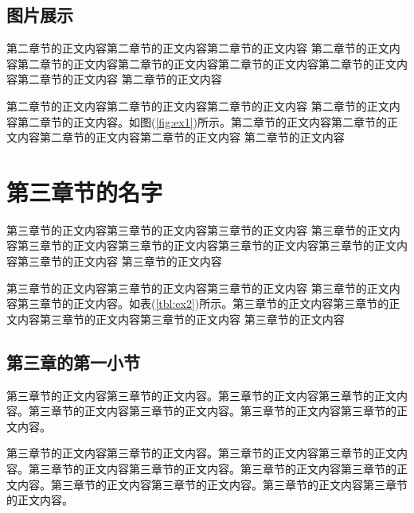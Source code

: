 \documentclass{yacaugrad}
\begin{document}
\subsection{图片展示}

第二章节的正文内容第二章节的正文内容\cite{王夫之1845}第二章节的正文内容
第二章节的正文内容第二章节的正文内容第二章节的正文内容第二章节的正文内容第二章节的正文内容第二章节的正文内容
第二章节的正文内容


第二章节的正文内容第二章节的正文内容第二章节的正文内容
第二章节的正文内容第二章节的正文内容。如图(\ref{fig:ex1})所示。第二章节的正文内容第二章节的正文内容第二章节的正文内容第二章节的正文内容
第二章节的正文内容

\section{第三章节的名字}

第三章节的正文内容第三章节的正文内容第三章节的正文内容
第三章节的正文内容第三章节的正文内容第三章节的正文内容第三章节的正文内容第三章节的正文内容第三章节的正文内容
第三章节的正文内容


第三章节的正文内容第三章节\cite{KENNEDY1975-339-360}的正文内容第三章节的正文内容
第三章节的正文内容第三章节的正文内容。如表(\ref{tbl:ex2})所示。第三章节的正文内容第三章节的正文内容第三章节的正文内容第三章节的正文内容
第三章节的正文内容

\subsection{第三章的第一小节}

第三章节的正文内容第三章节的正文内容。第三章节的正文内容第三章节的正文内容。第三章节的正文内容第三章节的正文内容。第三章节的正文内容第三章节的正文内容。

第三章节的正文内容第三章节的正文内容。第三章节的正文内容第三章节的正文内容。第三章节的正文内容第三章节的正文内容。第三章节的正文内容第三章节的正文内容。第三章节的正文内容第三章节的正文内容。第三章节的正文内容第三章节的正文内容。
\end{document}
